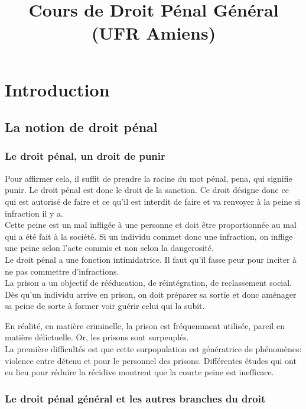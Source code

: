 \documentclass[10pt, a4paper, openany]{book}
\date{}
\title{Cours de Droit Pénal Général (UFR Amiens)}
\begin{document}
\maketitle
\tableofcontents

\chapter{Introduction}

\section{La notion de droit pénal}

\subsection{Le droit pénal, un droit de punir}

Pour affirmer cela, il suffit de prendre la racine du mot pénal, pena, qui signifie punir. Le droit pénal est donc le droit de la sanction. Ce droit désigne donc ce qui est autorisé de faire et ce qu'il est interdit de faire et va renvoyer à la peine si infraction il y a. \\
Cette peine est un mal infligée à une personne et doit être proportionnée au mal qui a été fait à la société. Si un individu commet donc une infraction, on inflige une peine selon l'acte commis et non selon la dangerosité. \\
Le droit pénal a une fonction intimidatrice. Il faut qu'il fasse peur pour inciter à ne pas commettre d'infractions. \\
La prison a un objectif de rééducation, de réintégration, de reclassement social. Dès qu'un individu arrive en prison, on doit préparer sa sortie et donc aménager sa peine de sorte à former voir guérir celui qui la subit. 


En réalité, en matière criminelle, la prison est fréquemment utilisée, pareil en matière délictuelle. Or, les prisons sont surpeuplés. \\
La première difficultés est que cette surpopulation est génératrice de phénomènes: violence entre détenu et pour le personnel des prisons. Différentes études qui ont eu lieu pour réduire la récidive montrent que la courte peine est inefficace. 

\subsection{Le droit pénal général et les autres branches du droit}
\end{document}

